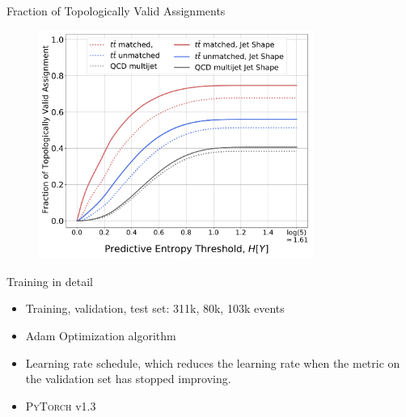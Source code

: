 \begin{frame}[fragile]{Fraction of Topologically Valid Assignments}
  \begin{figure}
    \centering
    \includegraphics[width=0.8\textwidth]{fig/topo-valid/frac_topo_valid.pdf}
  \end{figure}
\end{frame}

\begin{frame}[fragile]{Training in detail}
  \begin{itemize}
    \item Training, validation, test set: 311k, 80k, 103k events
    \item Adam Optimization algorithm
    \item Learning rate schedule, which reduces the learning rate when the metric on the validation set has stopped improving.
      \item \textsc{PyTorch} v1.3
  \end{itemize}
\end{frame}

